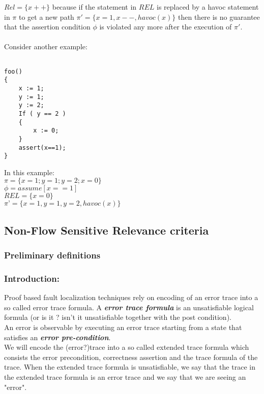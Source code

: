 \documentclass{article}
\begin{document}
$Rel =\{x++\}$ because if the statement in $REL$ is replaced by a havoc statement in $\pi$ to get a new path $\pi' =\{x=1, x--, havoc(x)\}$ then there is no guarantee that the assertion condition $\phi$ is violated any more after the execution of $\pi'$.
\\
\\
Consider another example:
\begin{lstlisting}

foo()
{
	x := 1;
	y := 1;
	y := 2;
	If ( y == 2 )
	{
		x := 0;
	}
	assert(x==1);
}

\end{lstlisting}
In this example: \\
$\pi = \{ x=1; y=1; y=2; x=0 \} $\\
$\phi = assume[x==1]$\\
$REL = \{ x=0 \}$ \\
$\pi’ = \{x=1, y=1, y=2, havoc(x)\}$

\subsection{Non-Flow Sensitive Relevance criteria }
\subsubsection{Preliminary definitions}
\subsubsection*{Introduction:}
Proof based fault localization techniques rely on encoding of an error trace into a so called error trace formula. A \textit{\textbf{error trace formula}} is an unsatisfiable logical formula (or is it ? isn't it unsatisfiable together with the post condition).\\
An error is observable by executing an error trace starting from a state that satisfies an \textbf{\textit{error pre-condition}}.\\
We will encode the (error?)trace into a so called extended trace formula which consists the error precondition, correctness assertion and the trace formula of the trace. When the extended trace formula is unsatisfiable, we say that the trace in the extended trace formula is an error trace and we say that we are seeing an "error".
\end{document}

